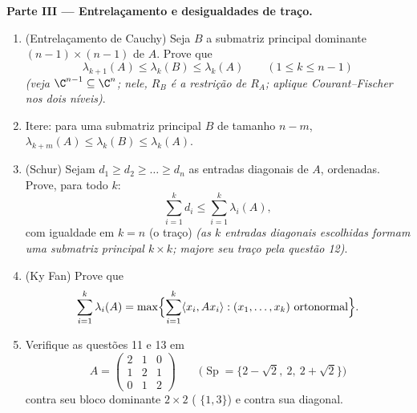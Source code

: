 \begin{problem}
\medskip
\noindent\textbf{Parte III --- Entrelaçamento e desigualdades de
traço.}
\begin{enumerate}[resume]
  \item (Entrelaçamento de Cauchy) Seja $B$ a submatriz principal dominante $(n-1)
        \times(n-1)$ de $A$. Prove que
        \[
        \lambda_{k+1}(A) \leq \lambda_k(B) \leq \lambda_k(A)
        \qquad (1 \leq k \leq n-1)
        \]
        \emph{(veja $\C^{n-1} \subseteq \C^n$; nele, $R_B$ é
        a restrição de $R_A$; aplique Courant--Fischer nos
        dois níveis)}.
  \item Itere: para uma submatriz principal $B$ de tamanho $n - m$,
        $\lambda_{k+m}(A) \leq \lambda_k(B) \leq
        \lambda_k(A)$.
  \item (Schur) Sejam $d_1 \geq d_2 \geq \dots \geq d_n$ as
        entradas diagonais de $A$, ordenadas. Prove, para todo $k$:
        \[
        \sum_{i=1}^{k} d_i \leq \sum_{i=1}^{k}\lambda_i(A),
        \]
        com igualdade em $k = n$ (o traço)
        \emph{(as $k$ entradas diagonais escolhidas formam uma
        submatriz principal $k\times k$; majore seu traço pela
        questão 12)}.
  \item (Ky Fan) Prove que
        \[
        \sum_{i=1}^{k}\lambda_i(A)
        = \max\Bigl\{\sum_{i=1}^{k}\langle x_i, Ax_i\rangle
        : (x_1, \dots, x_k) \text{ ortonormal}\Bigr\} .
        \]
  \item Verifique as questões 11 e 13 em
        \[
        A = \begin{pmatrix} 2 & 1 & 0\\ 1 & 2 & 1\\
        0 & 1 & 2\end{pmatrix}
        \qquad
        \bigl(\operatorname{Sp} = \{2 - \sqrt2,\ 2,\
        2+\sqrt2\}\bigr)
        \]
        contra seu bloco dominante $2\times2$ ( $\{1,
        3\}$) e contra sua diagonal.
\end{enumerate}


\end{problem}
